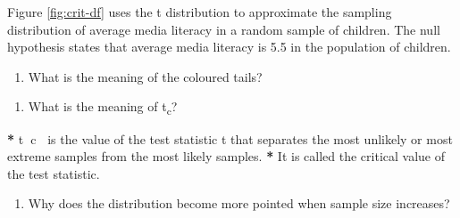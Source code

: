 \documentclass[a4paper]{book}
\newenvironment{Shaded}{\begin{snugshade}}{\end{snugshade}}
\newcommand{\KeywordTok}[1]{\textcolor[rgb]{0,0,0}{\textbf{#1}}}
\newcommand{\DecValTok}[1]{\textcolor[rgb]{0.00,0.00,0.00}{#1}}
\newcommand{\StringTok}[1]{\textcolor[rgb]{0.00,0.00,0.00}{#1}}
\newcommand{\OperatorTok}[1]{\textcolor[rgb]{0.00,0.00,0.00}{\textbf{#1}}}
\newcommand{\NormalTok}[1]{#1}
\providecommand{\tightlist}{%
  \setlength{\itemsep}{0pt}\setlength{\parskip}{0pt}}
\theoremstyle{definition}
\theoremstyle{definition}
\theoremstyle{definition}
\theoremstyle{remark}
\begin{document}
Figure \ref{fig:crit-df} uses the t distribution to approximate the
sampling distribution of average media literacy in a random sample of
children. The null hypothesis states that average media literacy is 5.5
in the population of children.

\begin{enumerate}
\def\labelenumi{\arabic{enumi}.}
\tightlist
\item
  What is the meaning of the coloured tails?
\end{enumerate}

\begin{Shaded}
\end{Shaded}

\begin{enumerate}
\def\labelenumi{\arabic{enumi}.}
\setcounter{enumi}{1}
\tightlist
\item
  What is the meaning of t\textsubscript{c}?
\end{enumerate}

\begin{Shaded}
\begin{Highlighting}[]
\OperatorTok{*}\StringTok{ }\NormalTok{t}\OperatorTok{~}\NormalTok{c}\OperatorTok{~}\StringTok{ }\NormalTok{is the value of the test statistic t that separates the most unlikely}
\NormalTok{or most extreme samples from the most likely samples.}
\OperatorTok{*}\StringTok{ }\NormalTok{It is called the critical value of the test statistic.}
\end{Highlighting}
\end{Shaded}

\begin{enumerate}
\def\labelenumi{\arabic{enumi}.}
\setcounter{enumi}{2}
\tightlist
\item
  Why does the distribution become more pointed when sample size
  increases?
\end{enumerate}
\end{document}
